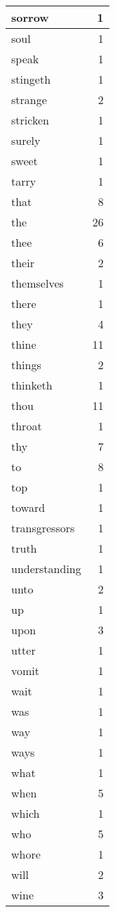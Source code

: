 \begin{center}
\begin{longtable}{l|r}
sorrow & 1\\ \hline 
soul & 1\\ \hline 
speak & 1\\ \hline 
stingeth & 1\\ \hline 
strange & 2\\ \hline 
stricken & 1\\ \hline 
surely & 1\\ \hline 
sweet & 1\\ \hline 
tarry & 1\\ \hline 
that & 8\\ \hline 
the & 26\\ \hline 
thee & 6\\ \hline 
their & 2\\ \hline 
themselves & 1\\ \hline 
there & 1\\ \hline 
they & 4\\ \hline 
thine & 11\\ \hline 
things & 2\\ \hline 
thinketh & 1\\ \hline 
thou & 11\\ \hline 
throat & 1\\ \hline 
thy & 7\\ \hline 
to & 8\\ \hline 
top & 1\\ \hline 
toward & 1\\ \hline 
transgressors & 1\\ \hline 
truth & 1\\ \hline 
understanding & 1\\ \hline 
unto & 2\\ \hline 
up & 1\\ \hline 
upon & 3\\ \hline 
utter & 1\\ \hline 
vomit & 1\\ \hline 
wait & 1\\ \hline 
was & 1\\ \hline 
way & 1\\ \hline 
ways & 1\\ \hline 
what & 1\\ \hline 
when & 5\\ \hline 
which & 1\\ \hline 
who & 5\\ \hline 
whore & 1\\ \hline 
will & 2\\ \hline 
wine & 3\\ \hline 

\end{longtable}
\end{center}

